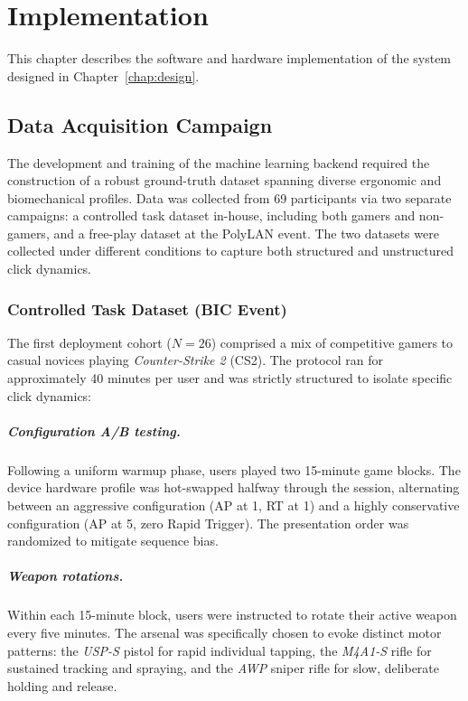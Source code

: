 \chapter{Implementation}
\label{chap:implementation}

This chapter describes the software and hardware implementation of the system designed in Chapter~\ref{chap:design}.

\section{Data Acquisition Campaign}
\label{sec:data_acquisition}

The development and training of the machine learning backend required the construction of a robust ground-truth dataset spanning diverse ergonomic and biomechanical profiles. Data was collected from 69 participants via two separate campaigns: a controlled task dataset in-house, including both gamers and non-gamers, and a free-play dataset at the PolyLAN event. The two datasets were collected under different conditions to capture both structured and unstructured click dynamics.

\subsection{Controlled Task Dataset (BIC Event)}
The first deployment cohort ($N=26$) comprised a mix of competitive gamers to casual novices playing \textit{Counter-Strike 2} (CS2). The protocol ran for approximately 40 minutes per user and was strictly structured to isolate specific click dynamics:

\paragraph{Configuration A/B testing.} Following a uniform warmup phase, users played two 15-minute game blocks. The device hardware profile was hot-swapped halfway through the session, alternating between an aggressive configuration (AP at 1, RT at 1) and a highly conservative configuration (AP at 5, zero Rapid Trigger). The presentation order was randomized to mitigate sequence bias.

\paragraph{Weapon rotations.} Within each 15-minute block, users were instructed to rotate their active weapon every five minutes. The arsenal was specifically chosen to evoke distinct motor patterns: the \textit{USP-S} pistol for rapid individual tapping, the \textit{M4A1-S} rifle for sustained tracking and spraying, and the \textit{AWP} sniper rifle for slow, deliberate holding and release.


